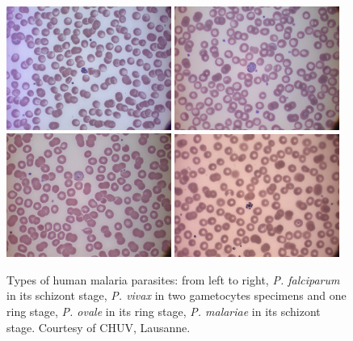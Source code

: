 \begin{figure}[h]
	\centering
	\includegraphics[width=0.48\textwidth]{images/malaria/f2_Pfalciparum}\vspace{1 mm}
	\includegraphics[width=0.48\textwidth]{images/malaria/f2_Pvivax}
	\includegraphics[width=0.48\textwidth]{images/malaria/f2_Povale}
	\includegraphics[width=0.48\textwidth]{images/malaria/f2_Pmalariae}
	\caption[Human malaria parasites.]{\label{fig:malaria_types}Types of human malaria parasites: from left to right, \emph{P. falciparum} in its schizont stage, \emph{P. vivax} in two gametocytes specimens and one ring stage, \emph{P. ovale} in its ring stage, \emph{P. malariae} in its schizont stage.
		Courtesy of CHUV, Lausanne.}
\end{figure}

